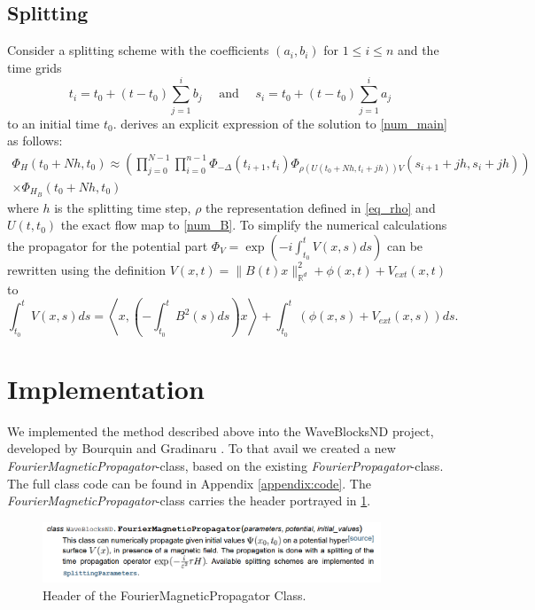 \documentclass[11pt, a4paper, oneside]{article}
\begin{document}
\subsection{Splitting}
Consider a splitting scheme with the coefficients $(a_i, b_i)$ for $1 \leq i \leq n$ and the time grids
\begin{equation*}
  t_{i}=t_{0}+\left(t-t_{0}\right) \sum_{j=1}^{i} b_{j} \quad \text { and } \quad s_{i}=t_{0}+\left(t-t_{0}\right) \sum_{j=1}^{i} a_{j}
\end{equation*}
to an initial time $t_0$.  derives an explicit expression of the solution to \cref{num_main} as follows:
\begin{multline} \label{eq:timesteps}
  \Phi_{H}\left(t_{0}+N h, t_{0}\right) \approx \left(\prod_{j=0}^{N-1} \prod_{i=0}^{n-1} \Phi_{-\Delta}\left(t_{i+1}, t_{i}\right) \Phi_{\rho\left(U\left(t_{0}+N h, t_{i}+j h\right)\right) V}\left(s_{i+1}+j h, s_{i}+j h\right)\right) \\ \times \Phi_{H_{B}}\left(t_{0}+N h, t_{0}\right)
\end{multline}
where $h$ is the splitting time step, $\rho$ the representation defined in \cref{eq_rho} and $U(t, t_0)$ the exact flow map to \cref{num_B}. \newline
To simplify the numerical calculations the propagator for the potential part $\Phi_{V} = \exp(-i \int_{t_0}^t V(x, s)ds)$ can be rewritten using the definition $V(x, t) = \lVert{B(t)x}\rVert_{\mathbb{R}^d}^2 + \phi(x,t) + V_{ext}(x,t)$ to
\begin{equation} \label{eq:rotinv}
  \int_{t_0}^t V(x, s) ds = \left\langle x, \left( -\int _{t_0}^t B^2(s)ds\right)x \right\rangle + \int _{t_0}^t \left( \phi(x, s) + V_{ext}(x, s)  \right) ds.
\end{equation}


\section{Implementation}
We implemented the method described above into the WaveBlocksND project, developed by Bourquin and Gradinaru . To that avail we created a new \emph{FourierMagneticPropagator}-class, based on the existing \emph{FourierPropagator}-class. The full class code can be found in Appendix \ref{appendix:code}.
The \emph{FourierMagneticPropagator}-class carries the header portrayed in \cref{fig:doc_fmp}.
\begin{figure}[h]
  \centering
  \includegraphics[width = 0.9\textwidth]{graphics/doc_fmp.PNG}
  \caption{Header of the FourierMagneticPropagator Class.}
  \label{fig:doc_fmp}
\end{figure}
\end{document}
